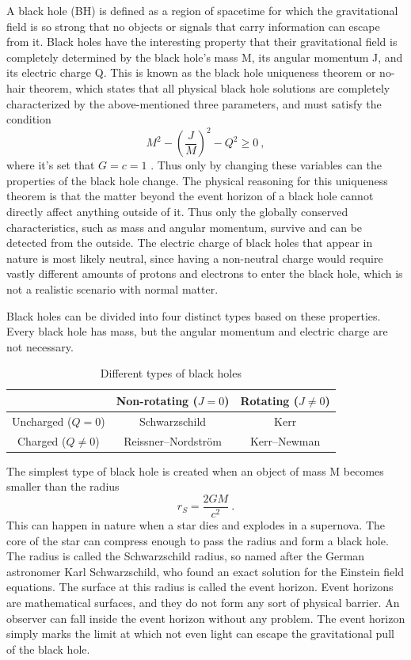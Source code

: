 \documentclass[english, oneside]{HYgradu}
\begin{document}
A black hole (BH) is defined as a region of spacetime for which the gravitational field is so strong that no objects or signals that carry information can escape from it. Black holes have the interesting property that their gravitational field is completely determined by the black hole's mass M, its angular momentum J, and its electric charge Q. This is known as the black hole uniqueness theorem or no-hair theorem, which states that all physical black hole solutions are completely characterized by the above-mentioned three parameters, and must satisfy the condition 
\begin{equation} \label{equ:bhunique}
M^2 - \left( \frac{J}{M} \right)^2 - Q^2 \geq 0 \ ,
\end{equation}
where it's set that $G = c = 1$ \citep{mazur:2001}.
Thus only by changing these variables can the properties of the black hole change. The physical reasoning for this uniqueness theorem is that the matter beyond the event horizon of a black hole cannot directly affect anything outside of it. Thus only the globally conserved characteristics, such as mass and angular momentum, survive and can be detected from the outside. The electric charge of black holes that appear in nature is most likely neutral, since having a non-neutral charge would require vastly different amounts of protons and electrons to enter the black hole, which is not a realistic scenario with normal matter.

Black holes can be divided into four distinct types based on these properties. Every black hole has mass, but the angular momentum and electric charge are not necessary.
\begin{table}[htb]
\centering
\caption{Different types of black holes}
\begin{tabular}{|c|c|c|}
\hline
 & Non-rotating ($J = 0$) & Rotating ($J \neq 0$) \\ \hline
Uncharged ($Q = 0$) & Schwarzschild & Kerr \\ \hline
Charged ($Q \neq 0$) & Reissner–Nordström & Kerr–Newman \\ \hline
\end{tabular}
\end{table}

The simplest type of black hole is created when an object of mass M becomes smaller than the radius
\begin{equation}
r_S = \frac{2GM}{c^2} \ .
\end{equation}
This can happen in nature when a star dies and explodes in a supernova. The core of the star can compress enough to pass the radius and form a black hole. The radius is called the Schwarzschild radius, so named after the German astronomer Karl Schwarzschild, who found an exact solution for the Einstein field equations. The surface at this radius is called the event horizon. Event horizons are mathematical surfaces, and they do not form any sort of physical barrier. An observer can fall inside the event horizon without any problem. The event horizon simply marks the limit at which not even light can escape the gravitational pull of the black hole.
\end{document}
